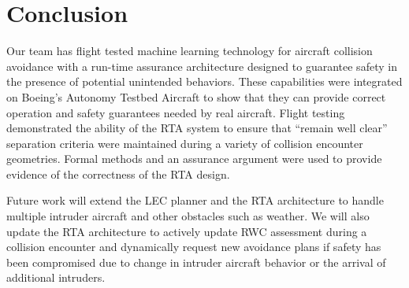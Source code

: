 \section{Conclusion}

%
%


Our team has flight tested machine learning technology for aircraft collision avoidance with a
run-time assurance architecture designed to guarantee safety in the presence of potential
unintended behaviors.  These capabilities were integrated on Boeing's
Autonomy Testbed Aircraft to show that they can provide correct operation and
safety guarantees needed by real aircraft.  Flight testing demonstrated the ability of the RTA
system to ensure that ``remain well clear'' separation criteria were maintained during a variety of 
collision encounter geometries.  Formal methods and an assurance argument were used to 
provide evidence of the correctness of the RTA design. 

Future work will extend the LEC planner and the RTA architecture to handle multiple intruder 
aircraft and other obstacles such as weather.  We will also update the RTA architecture to 
actively update RWC assessment during a collision encounter and dynamically request
new avoidance plans if safety has been compromised due to change in intruder aircraft behavior 
or the arrival of additional intruders.  
